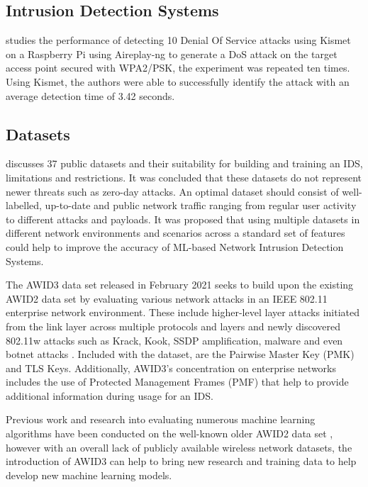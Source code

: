 \subsection{Intrusion Detection Systems}

\textcite{10.4108/eai.27-11-2021.2315535} studies the performance of detecting 10 Denial Of Service attacks using Kismet on a Raspberry Pi using Aireplay-ng to generate a DoS attack on the target access point secured with WPA2/PSK, the experiment was repeated ten times. Using Kismet, the authors were able to successfully identify the attack with an average detection time of 3.42 seconds.

\subsection{Datasets}

\textcite{9664737} discusses 37 public datasets and their suitability for building and training an IDS, limitations and restrictions. It was concluded that these datasets do not represent newer threats such as zero-day attacks. An optimal dataset should consist of well-labelled, up-to-date and public network traffic ranging from regular user activity to different attacks and payloads. It was proposed that using multiple datasets in different network environments and scenarios across a standard set of features could help to improve the accuracy of ML-based Network Intrusion Detection Systems.

\medskip

The AWID3 data set \parencite{9360747} released in February 2021 seeks to build upon the existing AWID2 data set by evaluating various network attacks in an IEEE 802.11 enterprise network environment. These include higher-level layer attacks initiated from the link layer across multiple protocols and layers and newly discovered 802.11w attacks such as Krack, Kook, SSDP amplification, malware and even botnet attacks \parencite{kolias2015intrusion}. Included with the dataset, are the Pairwise Master Key (PMK) and TLS Keys. Additionally, AWID3's concentration on enterprise networks includes the use of Protected Management Frames (PMF) that help to provide additional information during usage for an IDS. 

Previous work and research into evaluating numerous machine learning algorithms have been conducted on the well-known older AWID2 data set \parencite{kolias2015intrusion}, however with an overall lack of publicly available wireless network datasets, the introduction of AWID3 can help to bring new research and training data to help develop new machine learning models.  

